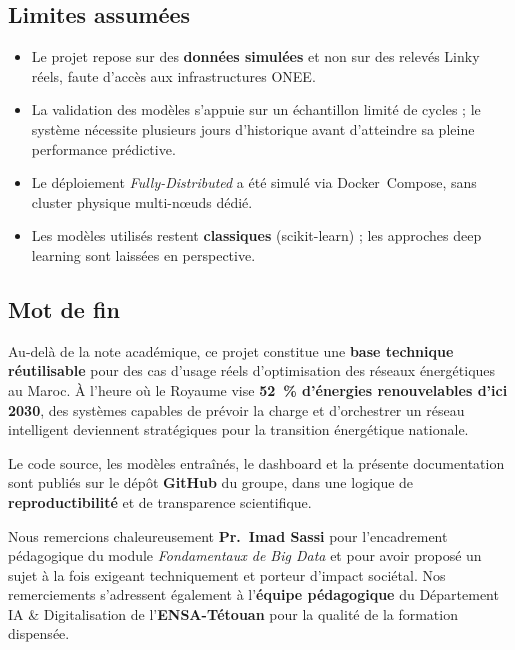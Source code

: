 \documentclass[11pt,a4paper]{article}
\begin{document}
\subsection{Limites assumées}

\begin{itemize}
  \item Le projet repose sur des \textbf{données simulées} et non sur des relevés Linky réels, faute d'accès aux infrastructures ONEE.
  \item La validation des modèles s'appuie sur un échantillon limité de cycles ; le système nécessite plusieurs jours d'historique avant d'atteindre sa pleine performance prédictive.
  \item Le déploiement \emph{Fully-Distributed} a été simulé via Docker~Compose, sans cluster physique multi-n\oe{}uds dédié.
  \item Les modèles utilisés restent \textbf{classiques} (scikit-learn) ; les approches deep learning sont laissées en perspective.
\end{itemize}

\subsection{Mot de fin}

Au-delà de la note académique, ce projet constitue une \textbf{base technique réutilisable} pour des cas d'usage réels d'optimisation des réseaux énergétiques au Maroc. À l'heure où le Royaume vise \textbf{52~\% d'énergies renouvelables d'ici 2030}, des systèmes capables de prévoir la charge et d'orchestrer un réseau intelligent deviennent stratégiques pour la transition énergétique nationale.

Le code source, les modèles entraînés, le dashboard et la présente documentation sont publiés sur le dépôt \textbf{GitHub} du groupe, dans une logique de \textbf{reproductibilité} et de transparence scientifique.

\bigskip

\begin{infobox}[title=Remerciements]
Nous remercions chaleureusement \textbf{Pr.~Imad Sassi} pour l'encadrement pédagogique du module \emph{Fondamentaux de Big Data} et pour avoir proposé un sujet à la fois exigeant techniquement et porteur d'impact sociétal. Nos remerciements s'adressent également à l'\textbf{équipe pédagogique} du Département IA \& Digitalisation de l'\textbf{ENSA-Tétouan} pour la qualité de la formation dispensée.
\end{infobox}
\end{document}
